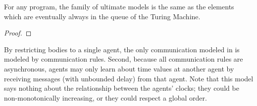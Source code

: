 \begin{lemma}
For any \lang program, the family of ultimate models is the same as the elements which are eventually always in the queue of the Turing Machine. 
\end{lemma}
\begin{proof}
\end{proof}

By restricting bodies to a single agent, the only communication
modeled in \lang is modeled by communication rules.  Second, because
all communication rules are asynchronous, agents may only learn about
time values at another agent by receiving messages (with unbounded
delay) from that agent.  Note that this model says nothing about the
relationship between the agents' clocks; they could be
non-monotonically increasing, or they could respect a global order.

%
